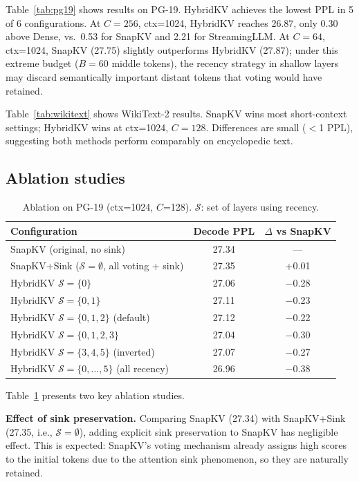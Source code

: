 \documentclass{article}
\begin{document}
Table~\ref{tab:pg19} shows results on PG-19. HybridKV achieves the lowest PPL in 5 of 6 configurations. At $C\!=\!256$, ctx=1024, HybridKV reaches 26.87, only 0.30 above Dense, vs.\ 0.53 for SnapKV and 2.21 for StreamingLLM. At $C\!=\!64$, ctx=1024, SnapKV (27.75) slightly outperforms HybridKV (27.87); under this extreme budget ($B\!=\!60$ middle tokens), the recency strategy in shallow layers may discard semantically important distant tokens that voting would have retained.

Table~\ref{tab:wikitext} shows WikiText-2 results. SnapKV wins most short-context settings; HybridKV wins at ctx=1024, $C\!=\!128$. Differences are small ($<$1 PPL), suggesting both methods perform comparably on encyclopedic text.

\subsection{Ablation studies}

\begin{table}[h]
\caption{Ablation on PG-19 (ctx=1024, $C$=128). $\mathcal{S}$: set of layers using recency.}
\label{tab:ablation}
\centering
\begin{tabular}{lcc}
\toprule
Configuration & Decode PPL & $\Delta$ vs SnapKV \\
\midrule
SnapKV (original, no sink) & 27.34 & --- \\
SnapKV+Sink ($\mathcal{S}\!=\!\emptyset$, all voting + sink) & 27.35 & +0.01 \\
\midrule
HybridKV $\mathcal{S}\!=\!\{0\}$ & 27.06 & $-$0.28 \\
HybridKV $\mathcal{S}\!=\!\{0,1\}$ & 27.11 & $-$0.23 \\
HybridKV $\mathcal{S}\!=\!\{0,1,2\}$ (default) & 27.12 & $-$0.22 \\
HybridKV $\mathcal{S}\!=\!\{0,1,2,3\}$ & 27.04 & $-$0.30 \\
HybridKV $\mathcal{S}\!=\!\{3,4,5\}$ (inverted) & 27.07 & $-$0.27 \\
HybridKV $\mathcal{S}\!=\!\{0,\ldots,5\}$ (all recency) & 26.96 & $-$0.38 \\
\bottomrule
\end{tabular}
\end{table}

Table~\ref{tab:ablation} presents two key ablation studies.

\textbf{Effect of sink preservation.} Comparing SnapKV (27.34) with SnapKV+Sink (27.35, i.e., $\mathcal{S}\!=\!\emptyset$), adding explicit sink preservation to SnapKV has negligible effect. This is expected: SnapKV's voting mechanism already assigns high scores to the initial tokens due to the attention sink phenomenon, so they are naturally retained.
\end{document}
